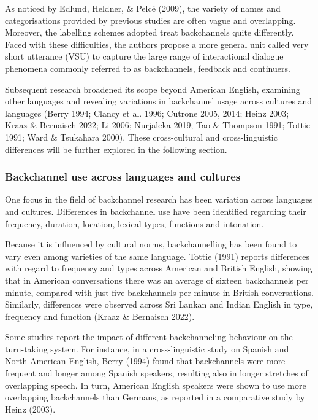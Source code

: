 \begin{styleStandard}
As noticed by Edlund, Heldner, \& Pelcé (2009), the variety of names and categorisations provided by previous studies are often vague and overlapping. Moreover, the labelling schemes adopted treat backchannels quite differently. Faced with these difficulties, the authors propose a more general unit called very short utterance (VSU) to capture the large range of interactional dialogue phenomena commonly referred to as backchannels, feedback and continuers.
\end{styleStandard}

\begin{styleStandard}
Subsequent research broadened its scope beyond American English, examining other languages and revealing variations in backchannel usage across cultures and languages (Berry 1994; Clancy et al. 1996; Cutrone 2005, 2014; Heinz 2003; Kraaz \& Bernaisch 2022; Li 2006; Nurjaleka 2019; Tao \& Thompson 1991; Tottie 1991; Ward \& Tsukahara 2000). These cross-cultural and cross-linguistic differences will be further explored in the following section.
\end{styleStandard}

\subsubsection{Backchannel use across languages and cultures}
\hypertarget{Toc191305945}{}\begin{styleStandard}
One focus in the field of backchannel research has been variation across languages and cultures. Differences in backchannel use have been identified regarding their frequency, duration, location, lexical types, functions and intonation.
\end{styleStandard}

\begin{styleStandard}
Because it is influenced by cultural norms, backchannelling has been found to vary even among varieties of the same language. Tottie (1991) reports differences with regard to frequency and types across American and British English, showing that in American conversations there was an average of sixteen backchannels per minute, compared with just five backchannels per minute in British conversations. Similarly, differences were observed across Sri Lankan and Indian English in type, frequency and function (Kraaz \& Bernaisch 2022).
\end{styleStandard}

\begin{styleStandard}
Some studies report the impact of different backchanneling behaviour on the turn-taking system. For instance, in a cross-linguistic study on Spanish and North-American English, Berry (1994) found that backchannels were more frequent and longer among Spanish speakers, resulting also in longer stretches of overlapping speech. In turn, American English speakers were shown to use more overlapping backchannels than Germans, as reported in a comparative study by Heinz (2003).
\end{styleStandard}

